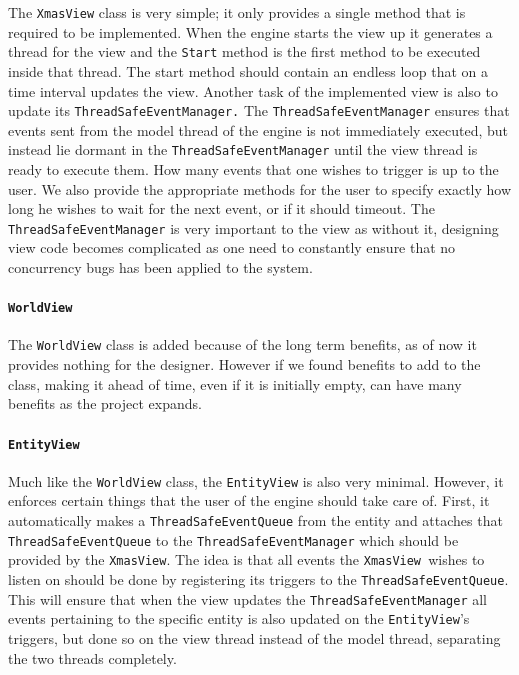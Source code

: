 The \texttt{XmasView} class is very simple; it only provides a single
method that is required to be implemented. When the engine starts
the view up it generates a thread for the view and the \texttt{Start}
method is the first method to be executed inside that thread. The
start method should contain an endless loop that on a time interval
updates the view. Another task of the implemented view is also to
update its \texttt{ThreadSafeEventManager.} The \texttt{ThreadSafeEventManager}
ensures that events sent from the model thread of the engine is not
immediately executed, but instead lie dormant in the \texttt{ThreadSafeEventManager}
until the view thread is ready to execute them. How many events that
one wishes to trigger is up to the user. We also provide the appropriate
methods for the user to specify exactly how long he wishes to wait
for the next event, or if it should timeout. The \texttt{ThreadSafeEventManager}
is very important to the view as without it, designing view code becomes
complicated as one need to constantly ensure that no concurrency bugs
has been applied to the system.


\paragraph*{\texttt{WorldView}}

The \texttt{WorldView} class is added because of the long term benefits,
as of now it provides nothing for the designer. However if we found
benefits to add to the class, making it ahead of time, even if it
is initially empty, can have many benefits as the project expands.


\paragraph*{\texttt{EntityView}}

Much like the \texttt{WorldView} class, the \texttt{EntityView} is
also very minimal. However, it enforces certain things that the user
of the engine should take care of. First, it automatically makes a
\texttt{ThreadSafeEventQueue} from the entity and attaches that \texttt{ThreadSafeEventQueue}
to the \texttt{ThreadSafeEventManager} which should be provided by
the \texttt{XmasView}. The idea is that all events the \texttt{XmasView
}wishes to listen on should be done by registering its triggers to
the \texttt{ThreadSafeEventQueue}. This will ensure that when the
view updates the \texttt{ThreadSafeEventManager} all events pertaining
to the specific entity is also updated on the \texttt{EntityView}\textquoteright{}s
triggers, but done so on the view thread instead of the model thread,
separating the two threads completely.


